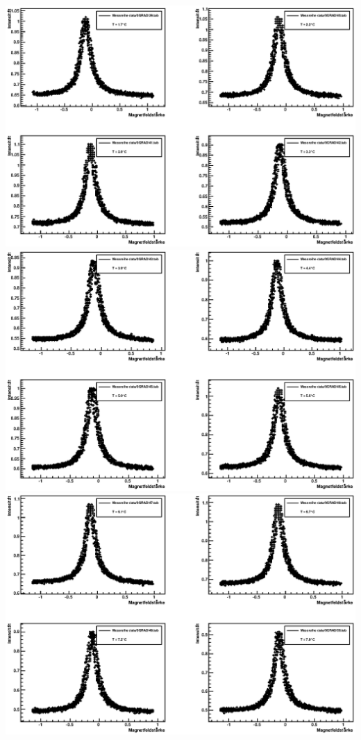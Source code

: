 \documentclass[12pt]{article}
\begin{document}
\includegraphics[width=1\linewidth]{pictures/15.eps} \\
\includegraphics[width=1\linewidth]{pictures/16.eps} \\
\includegraphics[width=1\linewidth]{pictures/17.eps} \\
\end{document}
